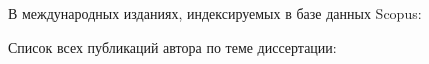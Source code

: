 В международных изданиях, индексируемых в базе данных Scopus:
\insertpapperScopus



Список всех публикаций автора по теме диссертации:
\insertpapperOther
